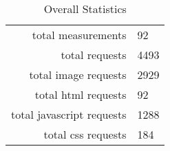 \begin{table}[h]
\caption{Overall Statistics}\centering
\begin{tabular}{rl}
total measurements & 92\\
total requests & 4493\\
total image requests & 2929\\
total html requests & 92\\
total javascript requests & 1288\\
total css requests & 184\\
\end{tabular}
\end{table}
